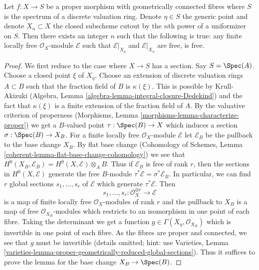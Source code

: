 \begin{lemma}
\label{lemma-trivial-fibres-dvr}
Let $f : X \to S$ be a proper morphism with geometrically connected fibres
where $S$ is the spectrum of a discrete valuation ring. Denote $\eta \in S$
the generic point and denote $X_n \subset X$ the closed subscheme
cutout by the $n$th power of a uniformizer on $S$.
Then there exists
an integer $n$ such that the following is true: any finite
locally free $\mathcal{O}_X$-module $\mathcal{E}$
such that $\mathcal{E}|_{X_\eta}$ and $\mathcal{E}|_{X_n}$
are free, is free.
\end{lemma}

\begin{proof}
We first reduce to the case where $X \to S$ has a section. Say $S = \Spec(A)$.
Choose a closed point $\xi$ of $X_\eta$. Choose an extension
of discrete valuation rings $A \subset B$ such that the fraction field
of $B$ is $\kappa(\xi)$. This is possible by Krull-Akizuki
(Algebra, Lemma \ref{algebra-lemma-integral-closure-Dedekind})
and the fact that $\kappa(\xi)$ is a finite extension of the
fraction field of $A$.
By the valuative criterion of properness
(Morphisms, Lemma \ref{morphisms-lemma-characterize-proper})
we get a $B$-valued point $\tau : \Spec(B) \to X$
which induces a section $\sigma : \Spec(B) \to X_B$.
For a finite locally free $\mathcal{O}_X$-module $\mathcal{E}$
let $\mathcal{E}_B$ be the pullback to the base change $X_B$.
By flat base change
(Cohomology of Schemes, Lemma \ref{coherent-lemma-flat-base-change-cohomology})
we see that $H^0(X_B, \mathcal{E}_B) = H^0(X, \mathcal{E}) \otimes_A B$.
Thus if $\mathcal{E}_B$ is free of rank $r$, then the sections in
$H^0(X, \mathcal{E})$ generate the free $B$-module
$\tau^*\mathcal{E} = \sigma^*\mathcal{E}_B$.
In particular, we can find $r$ global sections $s_1, \ldots, s_r$
of $\mathcal{E}$ which generate $\tau^*\mathcal{E}$. Then
$$
s_1, \ldots, s_r :
\mathcal{O}_X^{\oplus r}
\longrightarrow
\mathcal{E}
$$
is a map of finite locally free $\mathcal{O}_X$-modules of rank $r$
and the pullback to $X_B$ is a map of free $\mathcal{O}_{X_B}$-modules
which restricts to an isomorphism in one point of each fibre.
Taking the determinant we get a function
$g \in \Gamma(X_\eta, \mathcal{O}_{X_B})$
which is invertible in one point of each fibre.
As the fibres are proper and connected, we see that $g$
must be invertible (details omitted; hint: use Varieties, Lemma
\ref{varieties-lemma-proper-geometrically-reduced-global-sections}).
Thus it suffices to prove the lemma for the base change $X_B \to \Spec(B)$.


\end{proof}
